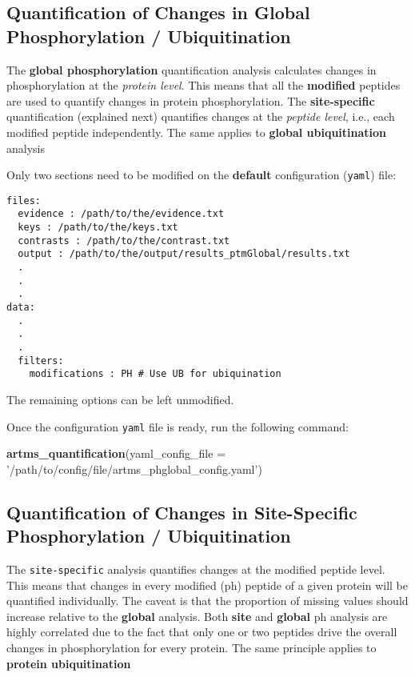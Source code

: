 \documentclass[]{article}
\newenvironment{Shaded}{\begin{snugshade}}{\end{snugshade}}
\newcommand{\KeywordTok}[1]{\textcolor[rgb]{0.13,0.29,0.53}{\textbf{#1}}}
\newcommand{\DataTypeTok}[1]{\textcolor[rgb]{0.13,0.29,0.53}{#1}}
\newcommand{\StringTok}[1]{\textcolor[rgb]{0.31,0.60,0.02}{#1}}
\newcommand{\NormalTok}[1]{#1}
\begin{document}
\subsection{Quantification of Changes in Global Phosphorylation /
Ubiquitination}\label{quantification-of-changes-in-global-phosphorylation-ubiquitination}

The \textbf{global phosphorylation} quantification analysis calculates
changes in phosphorylation at the \emph{protein level}. This means that
all the \textbf{modified} peptides are used to quantify changes in
protein phosphorylation. The \textbf{site-specific} quantification
(explained next) quantifies changes at the \emph{peptide level}, i.e.,
each modified peptide independently. The same applies to \textbf{global
ubiquitination} analysis

Only two sections need to be modified on the \textbf{default}
configuration (\texttt{yaml}) file:

\begin{verbatim}
files:
  evidence : /path/to/the/evidence.txt
  keys : /path/to/the/keys.txt
  contrasts : /path/to/the/contrast.txt
  output : /path/to/the/output/results_ptmGlobal/results.txt
  .
  .
  .
data:
  .
  .
  .
  filters:
    modifications : PH # Use UB for ubiquination
\end{verbatim}

The remaining options can be left unmodified.

Once the configuration \texttt{yaml} file is ready, run the following
command:

\begin{Shaded}
\begin{Highlighting}[]
\KeywordTok{artms_quantification}\NormalTok{(}\DataTypeTok{yaml_config_file =} \StringTok{'/path/to/config/file/artms_phglobal_config.yaml'}\NormalTok{)}
\end{Highlighting}
\end{Shaded}

\subsection{Quantification of Changes in Site-Specific Phosphorylation /
Ubiquitination}\label{quantification-of-changes-in-site-specific-phosphorylation-ubiquitination}

The \texttt{site-specific} analysis quantifies changes at the modified
peptide level. This means that changes in every modified (ph) peptide of
a given protein will be quantified individually. The caveat is that the
proportion of missing values should increase relative to the
\textbf{global} analysis. Both \textbf{site} and \textbf{global} ph
analysis are highly correlated due to the fact that only one or two
peptides drive the overall changes in phosphorylation for every protein.
The same principle applies to \textbf{protein ubiquitination}
\end{document}
